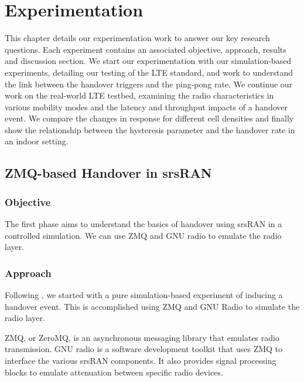 \chapter{Experimentation}

This chapter details our experimentation work to answer our key research questions. Each experiment contains an associated objective, approach, results and discussion section. We start our experimentation with our simulation-based experiments, detailing our testing of the LTE standard, and work to understand the link between the handover triggers and the ping-pong rate. We continue our work on the real-world LTE testbed, examining the radio characteristics in various mobility modes and the latency and throughput impacts of a handover event. We compare the changes in response for different cell densities and finally show the relationship between the hysteresis parameter and the handover rate in an indoor setting.

\section{ZMQ-based Handover in srsRAN}
\subsection{Objective}
The first phase aims to understand the basics of handover using srsRAN in a controlled simulation. We can use ZMQ and GNU radio to emulate the radio layer.

\subsection{Approach}
Following \citet{powell_handover_2021}, we started with a pure simulation-based experiment of inducing a handover event. This is accomplished using ZMQ and GNU Radio to simulate the radio layer.

ZMQ\cite{zeromq}, or ZeroMQ, is an asynchronous messaging library that emulates radio transmission. GNU radio\cite{gnuradio} is a software development toolkit that uses ZMQ to interface the various srsRAN components. It also provides signal processing blocks to emulate attenuation between specific radio devices.


